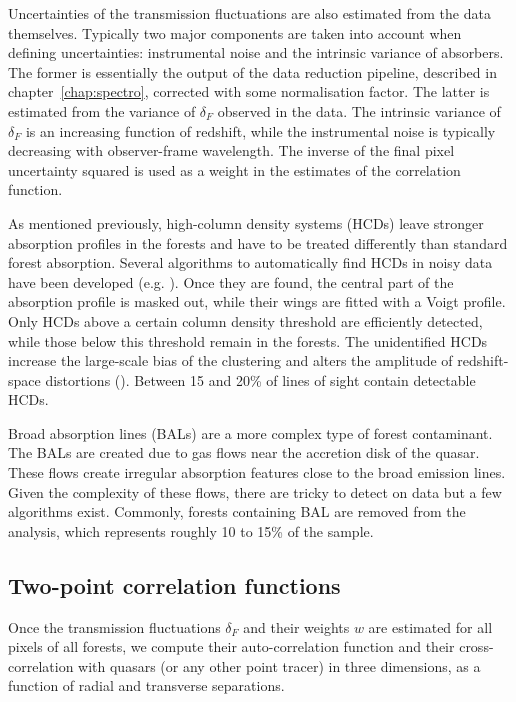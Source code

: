 Uncertainties of the transmission fluctuations are also estimated from the data 
themselves. Typically two major components are taken into account when defining 
uncertainties: instrumental noise and the intrinsic variance of absorbers.
The former is essentially the output of the data reduction pipeline, described 
in chapter~\ref{chap:spectro}, corrected with some normalisation factor. 
The latter is estimated from the variance of $\delta_F$ observed in the data. 
The intrinsic variance of $\delta_F$ is an increasing function of redshift, 
while the instrumental noise is typically decreasing with observer-frame wavelength.
The inverse of the final pixel uncertainty squared is used as a weight in the estimates of 
the correlation function.  

As mentioned previously, high-column density systems (HCDs) leave stronger absorption profiles 
in the forests and have to be treated differently than standard forest absorption.
Several algorithms to automatically find HCDs in noisy data have been developed 
(e.g. \cite{garnettDetectingDampedLy2017}).
Once they are found, the central part of the absorption profile is masked out, while their 
wings are fitted with a Voigt profile. Only HCDs above a certain column density 
threshold are efficiently detected, while those below this threshold remain in the forests.
The unidentified HCDs increase the large-scale bias of the clustering and alters the 
amplitude of redshift-space distortions 
(\cite{font-riberaLargescaleCrosscorrelationDamped2012, 
perez-rafolsSDSSDR12LargescaleCrosscorrelation2018}).
Between 15 and 20\% of lines of sight contain detectable HCDs. 

Broad absorption lines (BALs) are a more complex type of forest contaminant. 
The BALs are created due to gas flows near the accretion disk of the quasar. 
These flows create irregular absorption features close to the broad emission lines. 
Given the complexity of these flows, there are tricky to detect on data but 
a few algorithms exist. Commonly, forests containing BAL are removed from the analysis,
which represents roughly 10 to 15\% of the sample. 

\subsection{Two-point correlation functions}
\label{forests:bao:correlations}

Once the transmission fluctuations $\delta_F$ and their weights $w$ are estimated
for all pixels of all forests, we compute their auto-correlation function and 
their cross-correlation with quasars (or any other point tracer) in three dimensions, 
as a function of radial and transverse separations. 

